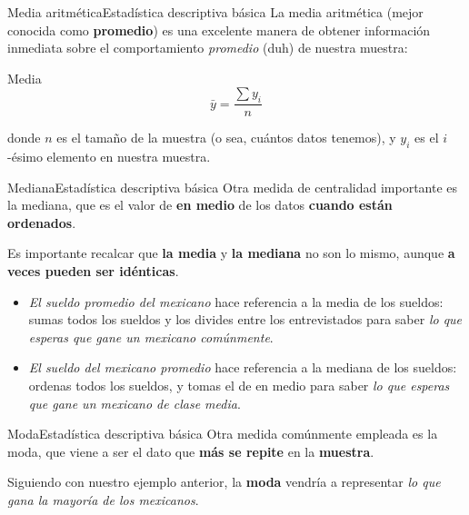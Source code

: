 \documentclass[spanish, c]{beamer}
\begin{document}
\begin{frame}{Media aritmética}{Estadística descriptiva básica}
    La \alert{media aritmética} (mejor conocida como \textbf{promedio}) es una excelente manera de obtener información inmediata sobre el comportamiento \textit{promedio} (duh) de nuestra muestra:

    \bigskip

    \begin{block}{Media}
        $$\bar{y} = \frac{\sum y_i}{n}$$
    \end{block}

    \bigskip

    donde $n$ es el \alert{tamaño de la muestra} (o sea, cuántos datos tenemos), y $y_i$ es el $i$-ésimo elemento en nuestra muestra.
\end{frame}

\begin{frame}{Mediana}{Estadística descriptiva básica}
    Otra medida de centralidad importante es la \alert{mediana}, que es el valor de \textbf{en medio} de los datos \textbf{cuando están ordenados}. \pause

    \bigskip

    Es importante recalcar que \textbf{la media} y \textbf{la mediana} \alert{no son lo mismo}, aunque \textbf{a veces pueden ser idénticas}. \pause

    \bigskip

    \begin{itemize}[<+->]
        \itemsep2ex
        \item \textit{El sueldo promedio del mexicano} hace referencia a la \alert{media} de los sueldos: sumas todos los sueldos y los divides entre los entrevistados para saber \textit{lo que esperas que gane un mexicano comúnmente}.
        \item \textit{El sueldo del mexicano promedio} hace referencia a la \alert{mediana} de los sueldos: ordenas todos los sueldos, y tomas el de en medio para saber \textit{lo que esperas que gane un mexicano de clase media}.
    \end{itemize}
\end{frame}

\begin{frame}{Moda}{Estadística descriptiva básica}
    Otra medida comúnmente empleada es la \alert{moda}, que viene a ser el dato que \textbf{más se repite} en la \textbf{muestra}. \pause

    \bigskip

    Siguiendo con nuestro ejemplo anterior, la \textbf{moda} vendría a representar \textit{lo que gana la mayoría de los mexicanos}.
\end{frame}
\end{document}
